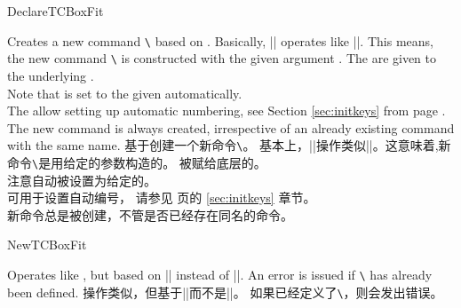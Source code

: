 \begin{docCommand}{DeclareTCBoxFit}{}
\begin{stripedbox}
Creates a new command \texttt{\textbackslash} based on .
Basically, |\DeclareTCBoxFit| operates like |\DeclareDocumentCommand|. This means,
the new command \texttt{\textbackslash} is constructed with the given argument .
The  are given to the underlying .\\
Note that  is set to the given 
automatically.\\
The  allow setting up automatic numbering,
see Section \ref{sec:initkeys} from page \pageref{sec:initkeys}.\\
The new command is always created, irrespective of an already existing
command with the same name.
\tcblower
基于创建一个新命令\texttt{\textbackslash}。%
基本上，|\DeclareTCBoxFit|操作类似|\DeclareDocumentCommand|。这意味着,新命令\texttt{\textbackslash}是用给定的参数构造的。
被赋给底层的。\\
注意自动被设置为给定的。\\
可用于设置自动编号，%
请参见 \pageref{sec:initkeys} 页的 \ref{sec:initkeys} 章节。\\
新命令总是被创建，不管是否已经存在同名的命令。
\end{stripedbox}
\end{docCommand}

\begin{docCommand}{NewTCBoxFit}{}
\begin{stripedbox}
Operates like , but based on |\NewDocumentCommand| instead of |\DeclareDocumentCommand|.
An error is issued if \texttt{\textbackslash} has already been defined.
\tcblower
操作类似，但基于|\NewDocumentCommand|而不是|\DeclareDocumentCommand|。
如果已经定义了\texttt{\textbackslash}，则会发出错误。
\end{stripedbox}
\end{docCommand}

